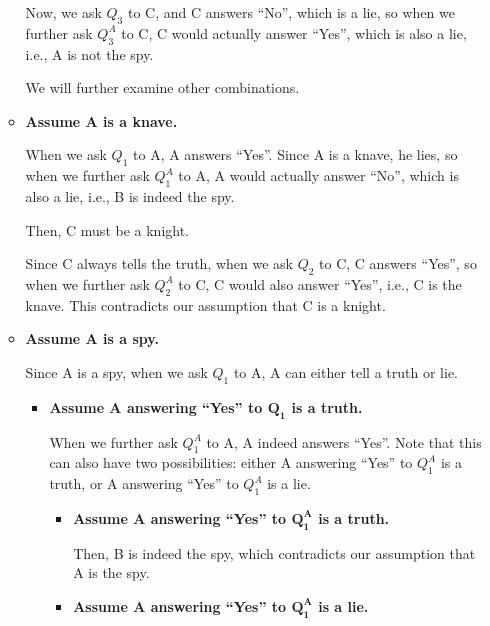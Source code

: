 \documentclass[answers]{exam}
\begin{document}
\begin{questions}
\begin{solution}
\begin{itemize}
\begin{itemize}
                Now, we ask $Q_3$ to C, and C answers ``No'', which is a lie,
                so when we further ask $Q^A_3$ to C, C would actually answer ``Yes'', which
                is also a lie, i.e., A is not the spy.
                
                We will further examine other combinations.

                \item \textbf{Assume A is a knave.}
                
                When we ask $Q_1$ to A, A answers ``Yes''. Since A is a knave, he lies,
                so when we further ask $Q^A_1$ to A, A would actually answer ``No'',
                which is also a lie, i.e., B is indeed the spy.
                
                Then, C must be a knight.

                Since C always tells the truth, when we ask $Q_2$ to C, C answers ``Yes'',
                so when we further ask $Q^A_2$ to C, C would also answer ``Yes'', i.e., C
                is the knave. This contradicts our assumption that C is a knight.

                \item \textbf{Assume A is a spy.}
                
                Since A is a spy, when we ask $Q_1$ to A, A can either tell a truth or lie.

                \begin{itemize}
                    \item \textbf{Assume A answering ``Yes'' to $\bm{Q_1}$ is a truth.}
                    
                    When we further ask $Q^A_1$ to A, A indeed answers ``Yes''. Note that
                    this can also have two possibilities: either A answering ``Yes'' to
                    $Q^A_1$ is a truth, or A answering ``Yes'' to $Q^A_1$ is a lie.

                    \begin{itemize}
                        \item \textbf{Assume A answering ``Yes'' to $\bm{Q^A_1}$ is a truth.}
                        
                        Then, B is indeed the spy, which contradicts our assumption that
                        A is the spy.

                        \item \textbf{Assume A answering ``Yes'' to $\bm{Q^A_1}$ is a lie.}
                        

\end{itemize}
\end{itemize}
\end{itemize}
\end{itemize}
\end{solution}
\end{questions}
\end{document}
